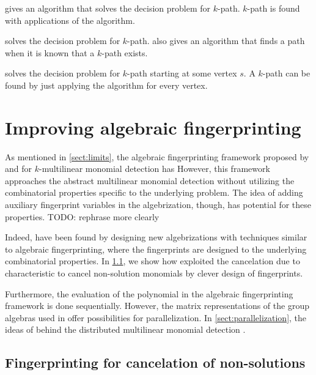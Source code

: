 \cite{Koutis08} gives an algorithm that solves the decision problem for $k$-path. 
$k$-path is found with  applications of the algorithm.

\cite{Williams09} solves the decision problem for $k$-path. \cite{Williams09} also gives an algorithm 
that finds a path when it is known that a $k$-path exists.

\cite{Björklund17} solves the decision problem for $k$-path starting at some vertex $s$. 
A $k$-path can be found by just applying the algorithm for every vertex.

\section{Improving algebraic fingerprinting}

As mentioned in \cref{sect:limits}, the algebraic fingerprinting framework proposed by 
\citeauthor{Koutis08} and \citeauthor{Williams09} \cite{Williams09, KouWil15} for 
$k$-multilinear monomial detection has
However, this framework 
approaches the abstract multilinear monomial detection without 
utilizing the combinatorial properties specific to the underlying problem. 
The idea of adding auxiliary fingerprint variables in the algebrization, though, 
has potential for these properties. TODO: rephrase more clearly

Indeed,
 have been found by designing new algebrizations with techniques 
similar to algebraic fingerprinting, where the fingerprints are designed to 
the underlying combinatorial properties. In \cref{sect:cancel_nonsolutions}, 
we show how \citeauthor{Björklund14} \cite{Björklund14}
exploited the cancelation due to characteristic to cancel non-solution monomials 
by clever design of fingerprints. 

Furthermore, the evaluation of the polynomial in the algebraic fingerprinting framework is done sequentially. 
However, the matrix representations of the group algebras used in \cite{Williams09} 
offer possibilities for parallelization.
In \cref{sect:parallelization},  the ideas of 
\citeauthor{Midas19} behind the distributed multilinear monomial detection
\cite{Midas19} .

\subsection{Fingerprinting for cancelation of non-solutions}
\label{sect:cancel_nonsolutions}

